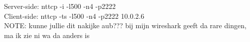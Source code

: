 Server-side: nttcp -i -l500 -n4 -p2222 \\
Client-side: nttcp -ts -l500 -n4 -p2222 10.0.2.6 \\

NOTE: kunne jullie dit nakijke aub??? bij mijn wireshark geeft da rare dingen, ma ik zie ni wa da anders is